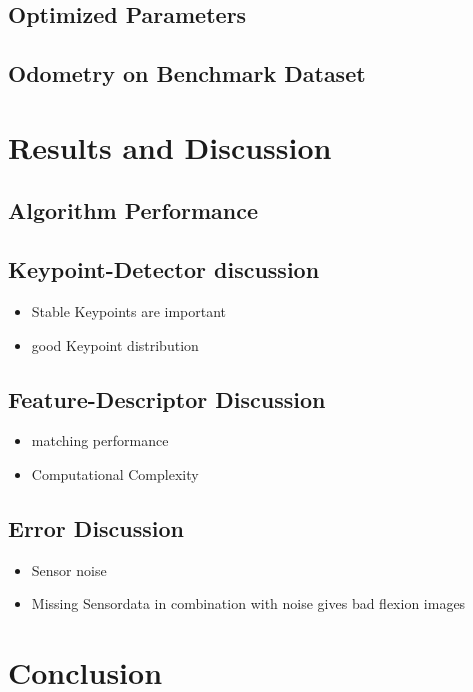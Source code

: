 \subsection{Optimized Parameters}

\subsection{Odometry on Benchmark Dataset}

\section{Results and Discussion}
\subsection{Algorithm Performance}
\subsection{Keypoint-Detector discussion}

\begin{itemize}
    \item Stable Keypoints are important
    \item good Keypoint distribution
\end{itemize}

\subsection{Feature-Descriptor Discussion}
\begin{itemize}
    \item matching performance
    \item Computational Complexity
\end{itemize}

\subsection{Error Discussion}
\begin{itemize}
    \item Sensor noise
    \item Missing Sensordata in combination with noise gives bad flexion images
\end{itemize}

\section{Conclusion}

